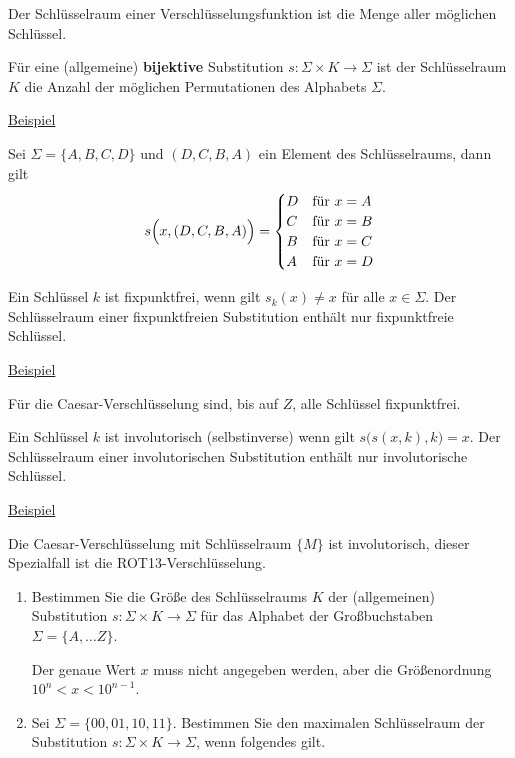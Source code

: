 \documentclass{uebungsblatt}
\begin{document}
\begin{aufgabe}
\medskip
Der Schlüsselraum einer Verschlüsselungsfunktion ist die Menge aller
möglichen Schlüssel.

Für eine (allgemeine) \textbf{bijektive} Substitution $s : \Sigma \times K \rightarrow \Sigma$ ist der Schlüsselraum $K$ die Anzahl der möglichen Permutationen des Alphabets
$\Sigma$.

\medskip
\underline{Beispiel}

Sei $\Sigma = \{A,B,C,D\}$ und $(D,C,B,A)$
ein Element des Schlüsselraums, dann gilt 
\begin{align*}
s\Bigl( x, (D,C,B,A) \Bigr) = 
\begin{cases}
D &\mbox{für } x = A \\
C &\mbox{für } x = B \\
B &\mbox{für } x = C \\
A &\mbox{für } x = D 
\end{cases}
\end{align*}

Ein Schlüssel $k$ ist fixpunktfrei, wenn gilt $s_k(x) \not= x$
für alle $x \in \Sigma$. Der Schlüsselraum einer 
fixpunktfreien Substitution enthält nur fixpunktfreie Schlüssel.

\underline{Beispiel}

Für die Caesar-Verschlüsselung sind, bis auf $Z$, alle Schlüssel 
fixpunktfrei.

\smallskip
Ein Schlüssel $k$ ist involutorisch (selbstinverse) wenn gilt
$s\bigl(s(x,k),k\bigr)=x$. Der Schlüsselraum einer 
involutorischen Substitution enthält nur involutorische Schlüssel.

\underline{Beispiel}

Die Caesar-Verschlüsselung mit Schlüsselraum $\{M\}$ ist involutorisch,
dieser Spezialfall ist die ROT13-Verschlüsselung.

\begin{enumerate}
\item 
Bestimmen Sie die Größe des Schlüsselraums $K$ der (allgemeinen) 
Substitution $s : \Sigma \times K \rightarrow \Sigma$
für das Alphabet der Großbuchstaben $\Sigma = \{A, \ldots Z\}$.

Der genaue Wert $x$ muss nicht angegeben werden, aber die Größenordnung
$10^n < x < 10^{n-1}$. \\

\item
Sei $\Sigma = \{00, 01, 10, 11\}$. 
Bestimmen Sie den maximalen Schlüsselraum 
der Substitution $s : \Sigma \times K \rightarrow \Sigma$, wenn
folgendes gilt.


\end{enumerate}
\end{aufgabe}
\end{document}
